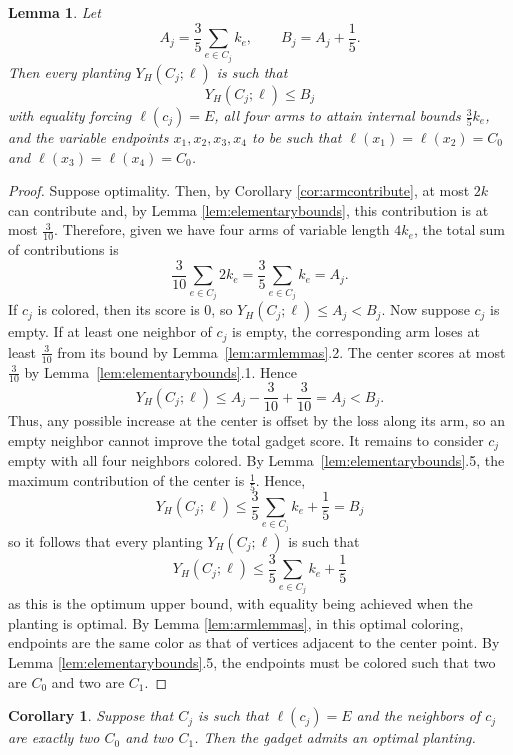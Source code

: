\documentclass[11pt]{article}
\theoremstyle{plain}
\newtheorem{lemma}[theorem]{Lemma}
\newtheorem{corollary}[theorem]{Corollary}
\begin{document}
\begin{lemma} \label{lem:gadgetbound}
    Let 
    \[A_j = \frac{3}{5} \sum_{e \in C_j} k_e, \qquad B_j = A_j + \frac{1}{5}.\]
    Then every planting $Y_H(C_j; \ell)$ is such that
    \[Y_H(C_j; \ell) \leq B_j\]
    with equality forcing $\ell(c_j) = E$, all four arms to attain internal bounds $\frac{3}{5}k_e$, and the variable endpoints $x_1, x_2, x_3, x_4$ to be such that $\ell(x_1) = \ell (x_2) = C_0$ and $\ell(x_3) = \ell (x_4) = C_0$.
\end{lemma}

\begin{proof}
    Suppose optimality. Then, by Corollary \ref{cor:armcontribute}, at most $2k$ can contribute and, by Lemma \ref{lem:elementarybounds}, this contribution is at most $\frac{3}{10}$. Therefore, given we have four arms of variable length $4k_e$, the total sum of contributions is
    \[\frac{3}{10}\sum_{e \in C_j} 2k_e = \frac{3}{5} \sum_{e \in C_j} k_e = A_j.\]
    If $c_j$ is colored, then its score is $0$, so $Y_H(C_j;\ell)\leq A_j<B_j$.
    Now suppose $c_j$ is empty. If at least one neighbor of $c_j$ is empty, the corresponding arm loses at least $\frac{3}{10}$ from its bound by Lemma~\ref{lem:armlemmas}.2. The center scores at most $\frac{3}{10}$ by Lemma~\ref{lem:elementarybounds}.1. Hence
    \[
    Y_H(C_j;\ell)\leq A_j-\frac{3}{10}+\frac{3}{10}=A_j<B_j.
    \]
    Thus, any possible increase at the center is offset by the loss along its arm, so an empty neighbor cannot improve the total gadget score. It remains to consider $c_j$ empty with all four neighbors colored. By Lemma~\ref{lem:elementarybounds}.5, the maximum contribution of the center is $\frac15$. Hence,
    \[Y_H(C_j;\ell) \leq \frac{3}{5} \sum_{e \in C_j} k_e + \frac{1}{5} = B_j\]
    so it follows that every planting $Y_H(C_j; \ell)$ is such that
    \[Y_H(C_j; \ell) \leq \frac{3}{5} \sum_{e \in C_j} k_e + \frac{1}{5}\]
    as this is the optimum upper bound, with equality being achieved when the planting is optimal. By Lemma \ref{lem:armlemmas}, in this optimal coloring, endpoints are the same color as that of vertices adjacent to the center point. By Lemma \ref{lem:elementarybounds}.5, the endpoints must be colored such that two are $C_0$ and two are $C_1$.
\end{proof}

\begin{corollary} \label{cor:optplantcond}
    Suppose that $C_j$ is such that $\ell(c_j) = E$ and the neighbors of $c_j$ are exactly two $C_0$ and two $C_1$. Then the gadget admits an optimal planting.
\end{corollary}
\end{document}
